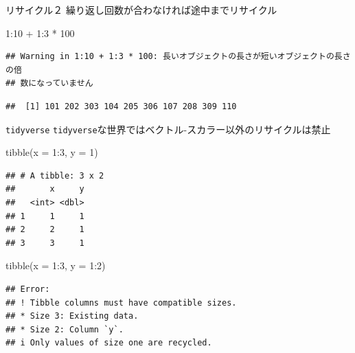 \documentclass[
  ignorenonframetext,
]{beamer}
\newenvironment{Shaded}{\begin{snugshade}}{\end{snugshade}}
\newcommand{\AttributeTok}[1]{\textcolor[rgb]{0.77,0.63,0.00}{#1}}
\newcommand{\DecValTok}[1]{\textcolor[rgb]{0.00,0.00,0.81}{#1}}
\newcommand{\FunctionTok}[1]{\textcolor[rgb]{0.00,0.00,0.00}{#1}}
\newcommand{\NormalTok}[1]{#1}
\newcommand{\SpecialCharTok}[1]{\textcolor[rgb]{0.00,0.00,0.00}{#1}}
\begin{document}
\begin{frame}[fragile]{リサイクル２}
\protect\hypertarget{ux30eaux30b5ux30a4ux30afux30ebuxff12}{}
繰り返し回数が合わなければ途中までリサイクル

\begin{Shaded}
\begin{Highlighting}[]
\DecValTok{1}\SpecialCharTok{:}\DecValTok{10} \SpecialCharTok{+} \DecValTok{1}\SpecialCharTok{:}\DecValTok{3} \SpecialCharTok{*} \DecValTok{100}
\end{Highlighting}
\end{Shaded}

\begin{verbatim}
## Warning in 1:10 + 1:3 * 100: 長いオブジェクトの長さが短いオブジェクトの長さの倍
## 数になっていません
\end{verbatim}

\begin{verbatim}
##  [1] 101 202 303 104 205 306 107 208 309 110
\end{verbatim}
\end{frame}

\begin{frame}[fragile]{\texttt{tidyverse}}
\protect\hypertarget{tidyverse}{}
\texttt{tidyverse}な世界ではベクトル-スカラー以外のリサイクルは禁止

\begin{Shaded}
\begin{Highlighting}[]
\FunctionTok{tibble}\NormalTok{(}\AttributeTok{x =} \DecValTok{1}\SpecialCharTok{:}\DecValTok{3}\NormalTok{, }\AttributeTok{y =} \DecValTok{1}\NormalTok{)}
\end{Highlighting}
\end{Shaded}

\begin{verbatim}
## # A tibble: 3 x 2
##       x     y
##   <int> <dbl>
## 1     1     1
## 2     2     1
## 3     3     1
\end{verbatim}

\begin{Shaded}
\begin{Highlighting}[]
\FunctionTok{tibble}\NormalTok{(}\AttributeTok{x =} \DecValTok{1}\SpecialCharTok{:}\DecValTok{3}\NormalTok{, }\AttributeTok{y =} \DecValTok{1}\SpecialCharTok{:}\DecValTok{2}\NormalTok{)}
\end{Highlighting}
\end{Shaded}

\begin{verbatim}
## Error:
## ! Tibble columns must have compatible sizes.
## * Size 3: Existing data.
## * Size 2: Column `y`.
## i Only values of size one are recycled.
\end{verbatim}
\end{frame}
\end{document}
